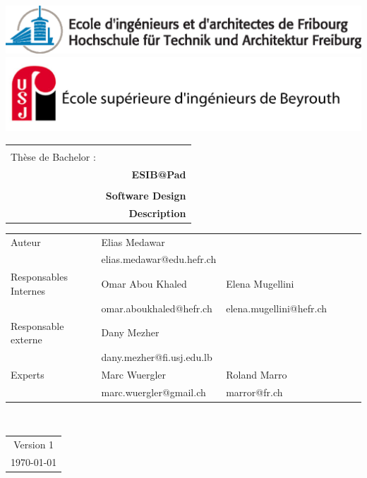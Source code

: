 \begin{titlepage}
\setlength\topmargin{0in}
\setlength\headheight{-0.3in}
\begin{center}

\includegraphics[width=1\textwidth]{../comon/logos/EIA_couleur.eps}  \\

\includegraphics[width=1\textwidth]{../comon/logos/esib_nom.jpg}  \\[0.5cm] 
\end{center}

\begin{tabular}{p{9cm} r}
\hline \\[1cm]
{ \huge {Thèse de Bachelor : } } &  \\
&  \huge \bfseries  ESIB@Pad  \\[1cm]
\hline \\[0.3cm]
 & \Large \bfseries Software  Design \\
 & \Large \bfseries Description \\[1cm]
\end{tabular}

\begin{tabular}{l l l l l l}
Auteur & Elias Medawar & \\[0.1cm]
& elias.medawar@edu.hefr.ch & \\[0.5cm]
Responsables Internes  & Omar Abou Khaled & Elena Mugellini  \\[0.1cm]
&omar.aboukhaled@hefr.ch  & elena.mugellini@hefr.ch \\[0.5cm]	
Responsable externe & Dany Mezher & \\[0.1cm]
&dany.mezher@fi.usj.edu.lb   & \\[0.5cm]
Experts & Marc Wuergler  & Roland Marro   \\[.1cm]
&marc.wuergler@gmail.ch & marror@fr.ch \\[1.5cm]	
\end{tabular}
\\
\begin{center}
\begin{tabular}{c}
Version  1 \\[0.5cm]
 {\today} \\[0.5cm]
\end{tabular}
 \end{center}
\end{titlepage}

